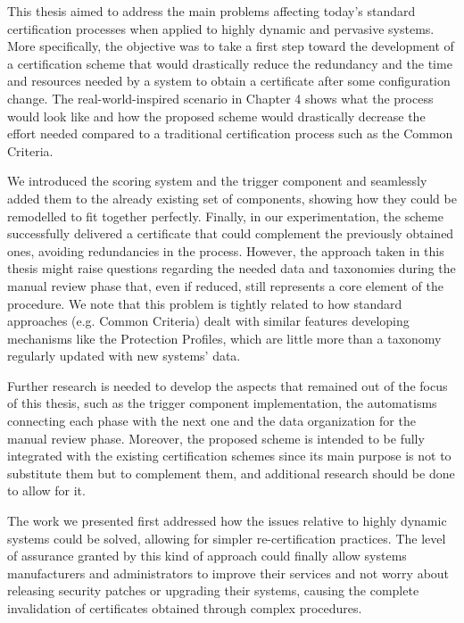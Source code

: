 This thesis aimed to address the main problems affecting today's standard certification processes when applied to highly dynamic and pervasive systems. More specifically, the objective was to take a first step toward the development of a certification scheme that would drastically reduce the redundancy and the time and resources needed by a system to obtain a certificate after some configuration change. The real-world-inspired scenario in Chapter 4 shows what the process would look like and how the proposed scheme would drastically decrease the effort needed compared to a traditional certification process such as the Common Criteria.

We introduced the scoring system and the trigger component and seamlessly added them to the already existing set of components, showing how they could be remodelled to fit together perfectly. Finally, in our experimentation, the scheme successfully delivered a certificate that could complement the previously obtained ones, avoiding redundancies in the process. However, the approach taken in this thesis might raise questions regarding the needed data and taxonomies during the manual review phase that, even if reduced, still represents a core element of the procedure. We note that this problem is tightly related to how standard approaches (e.g. Common Criteria) dealt with similar features developing mechanisms like the Protection Profiles, which are little more than a taxonomy regularly updated with new systems' data.

Further research is needed to develop the aspects that remained out of the focus of this thesis, such as the trigger component implementation, the automatisms connecting each phase with the next one and the data organization for the manual review phase. Moreover, the proposed scheme is intended to be fully integrated with the existing certification schemes since its main purpose is not to substitute them but to complement them, and additional research should be done to allow for it.

The work we presented first addressed how the issues relative to highly dynamic systems could be solved, allowing for simpler re-certification practices. The level of assurance granted by this kind of approach could finally allow systems manufacturers and administrators to improve their services and not worry about releasing security patches or upgrading their systems, causing the complete invalidation of certificates obtained through complex procedures. 